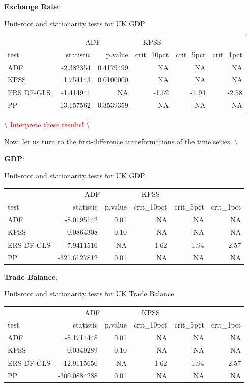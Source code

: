 \documentclass[
]{article}
\begin{document}
\textbf{Exchange Rate}:

\bgroup \table[H]
\centering
\caption{\label{tab:unnamed-chunk-4}Unit-root and stationarity tests for UK GDP}
\centering
\begin{tabular}[t]{lrrrrr}
\toprule
\multicolumn{1}{c}{ } & \multicolumn{2}{c}{ADF} & \multicolumn{1}{c}{KPSS} \\
\cmidrule(l{3pt}r{3pt}){2-3} \cmidrule(l{3pt}r{3pt}){4-4}
test & statistic & p.value & crit\_10pct & crit\_5pct & crit\_1pct\\
\midrule
ADF & -2.382354 & 0.4179499 & NA & NA & NA\\
KPSS & 1.754143 & 0.0100000 & NA & NA & NA\\
ERS DF-GLS & -1.414941 & NA & -1.62 & -1.94 & -2.58\\
PP & -13.157562 & 0.3539359 & NA & NA & NA\\
\bottomrule
\end{tabular}
\endtable\egroup

\textbackslash{} \textcolor{red}{Interprete these results!}
\textbackslash{}

Now, let us turn to the first-difference transformations of the time
series. \textbackslash{}

\textbf{GDP}:

\bgroup \table[H]
\centering
\caption{\label{tab:unnamed-chunk-5}Unit-root and stationarity tests for UK GDP}
\centering
\begin{tabular}[t]{lrrrrr}
\toprule
\multicolumn{1}{c}{ } & \multicolumn{2}{c}{ADF} & \multicolumn{1}{c}{KPSS} \\
\cmidrule(l{3pt}r{3pt}){2-3} \cmidrule(l{3pt}r{3pt}){4-4}
test & statistic & p.value & crit\_10pct & crit\_5pct & crit\_1pct\\
\midrule
ADF & -8.0195142 & 0.01 & NA & NA & NA\\
KPSS & 0.0864308 & 0.10 & NA & NA & NA\\
ERS DF-GLS & -7.9411516 & NA & -1.62 & -1.94 & -2.57\\
PP & -321.6127812 & 0.01 & NA & NA & NA\\
\bottomrule
\end{tabular}
\endtable\egroup

\textbf{Trade Balance}:

\bgroup \table[H]
\centering
\caption{\label{tab:unnamed-chunk-6}Unit-root and stationarity tests for UK Trade Balance}
\centering
\begin{tabular}[t]{lrrrrr}
\toprule
\multicolumn{1}{c}{ } & \multicolumn{2}{c}{ADF} & \multicolumn{1}{c}{KPSS} \\
\cmidrule(l{3pt}r{3pt}){2-3} \cmidrule(l{3pt}r{3pt}){4-4}
test & statistic & p.value & crit\_10pct & crit\_5pct & crit\_1pct\\
\midrule
ADF & -8.1714448 & 0.01 & NA & NA & NA\\
KPSS & 0.0349289 & 0.10 & NA & NA & NA\\
ERS DF-GLS & -12.9115650 & NA & -1.62 & -1.94 & -2.57\\
PP & -300.0884288 & 0.01 & NA & NA & NA\\
\bottomrule
\end{tabular}
\endtable\egroup
\end{document}
